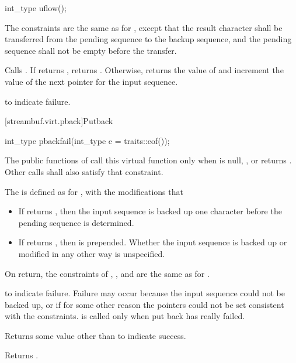 %
\begin{itemdecl}
int_type uflow();
\end{itemdecl}

\begin{itemdescr}
\pnum
\requires
The constraints are the same as for
,
except that the result character shall be transferred from the pending
sequence to the backup sequence, and the pending sequence shall not
be empty before the transfer.

\pnum
{}
Calls
.
If
returns
,
returns
.
Otherwise, returns the value of
and increment the value of the next pointer for the input sequence.

\pnum
\returns
{}
to indicate failure.
\end{itemdescr}

[streambuf.virt.pback]{Putback}

%
\begin{itemdecl}
int_type pbackfail(int_type c = traits::eof());
\end{itemdecl}

\begin{itemdescr}
\pnum
\remarks
The public functions of
call this virtual function only when
is null,
,
or
returns
.
Other calls shall also satisfy that constraint.

The
is defined as for
,
with the modifications that
\begin{itemize}
\item
If
returns
,
then the input sequence is backed up one character before the pending sequence is determined.
\item
If
returns , then  is prepended.
Whether the input sequence is backed up or modified in any other way is unspecified.
\end{itemize}

\pnum
\ensures
On return, the constraints of
,
,
and
are the same as for
.

\pnum
\returns
{}
to indicate failure.
Failure may occur because the input sequence could not be backed up, or if for some
other reason the pointers could not be set consistent with the constraints.
is called only when put back has really failed.

\pnum
Returns some value other than
to indicate success.

\pnum
{}
Returns
.
\end{itemdescr}

